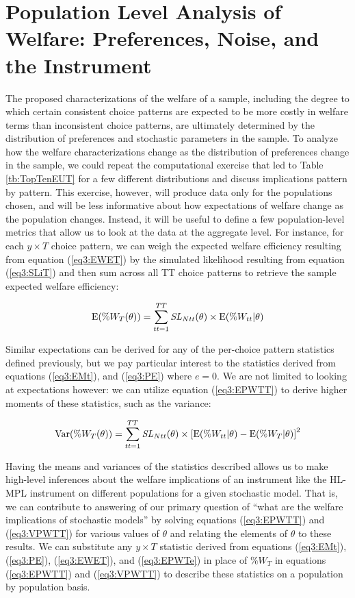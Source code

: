 \documentclass[../main.tex]{subfiles}
\begin{document}
\section{Population Level Analysis of Welfare: Preferences, Noise, and the Instrument}

The proposed characterizations of the welfare of a sample, including the degree to which certain consistent choice patterns are expected to be more costly in welfare terms than inconsistent choice patterns, are ultimately determined by the distribution of preferences and stochastic parameters in the sample.
To analyze how the welfare characterizations change as the distribution of preferences change in the sample, we could repeat the computational exercise that led to Table \ref{tb:TopTenEUT} for a few different distributions and discuss implications pattern by pattern.
This exercise, however, will produce data only for the populations chosen, and will be less informative about how expectations of welfare change as the population changes.
Instead, it will be useful to define a few population-level metrics that allow us to look at the data at the aggregate level.
For instance, for each $y \times T$ choice pattern, we can weigh the expected welfare efficiency resulting from equation (\ref{eq3:EWET}) by the simulated likelihood resulting from equation (\ref{eq3:SLiT}) and then sum across all TT choice patterns to retrieve the sample expected welfare efficiency:

\begin{equation}
	\label{eq3:EPWTT}
	\operatorname{E}(\%W_T(\theta)) = \sum_{tt=1}^{TT} \mathit{SL}_{Ntt}(\theta) \times \operatorname{E}(\%W_{tt} | \theta)
\end{equation}

Similar expectations can be derived for any of the per-choice pattern statistics defined previously, but we pay particular interest to the statistics derived from equations (\ref{eq3:EMt}), and (\ref{eq3:PE}) where $e=0$.
We are not limited to looking at expectations however: we can utilize equation (\ref{eq3:EPWTT}) to derive higher moments of these statistics, such as the variance:

\begin{equation}
	\label{eq3:VPWTT}
	\operatorname{Var}(\%W_T(\theta)) = \sum_{tt=1}^{TT} \mathit{SL}_{Ntt}(\theta) \times \left[ \operatorname{E}(\%W_{tt} | \theta) - \operatorname{E}(\%W_T | \theta) \right]^2
\end{equation}

Having the means and variances of the statistics described allows us to make high-level inferences about the welfare implications of an instrument like the HL-MPL instrument on different populations for a given stochastic model.
That is, we can contribute to answering of our primary question of \enquote{what are the welfare implications of stochastic models} by solving equations (\ref{eq3:EPWTT}) and (\ref{eq3:VPWTT}) for various values of $\theta$ and relating the elements of $\theta$ to these results.
We can substitute any  $y \times T$ statistic derived from equations (\ref{eq3:EMt}), (\ref{eq3:PE}), (\ref{eq3:EWET}), and (\ref{eq3:EPWTe}) in place of $\%W_T$ in equations (\ref{eq3:EPWTT}) and (\ref{eq3:VPWTT}) to describe these statistics on a population by population basis.
\end{document}
